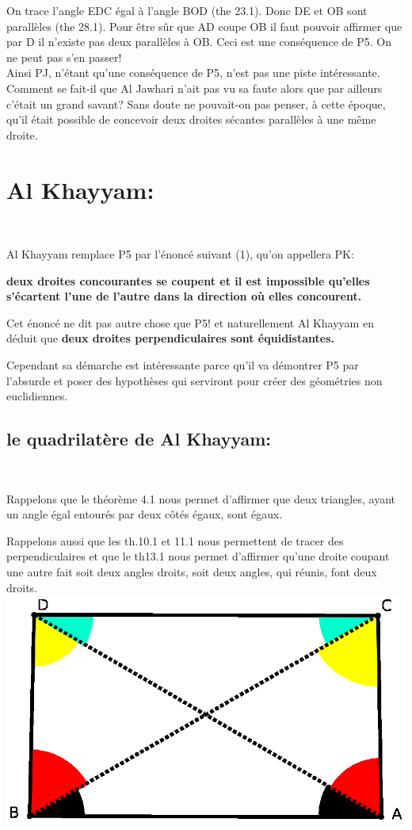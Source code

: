 \documentclass[a4paper, 12pt, twoside]{book}
\begin{document}
    On trace l'angle EDC égal à l'angle BOD (the 23.1). Donc DE et OB sont parallèles (the 28.1). Pour être sûr que AD coupe OB il faut pouvoir affirmer que par D il n'existe pas deux parallèles à OB. Ceci est une conséquence de P5. On ne peut pas s'en passer! \\
    
    Ainsi PJ, n'étant qu'une conséquence de P5, n'est pas une piste intéressante.\\
    
    Comment se fait-il que Al Jawhari n'ait pas vu sa faute alors que par ailleurs c'était un grand savant? Sans doute ne pouvait-on pas penser, à cette époque, qu'il était possible de concevoir deux droites sécantes parallèles à une même droite.  
   

\chapter{Al Khayyam:}\

    
 Al Khayyam remplace P5 par l'énoncé suivant (1), qu'on appellera PK:\
 
 \textbf{deux droites concourantes se coupent et il est impossible qu'elles s'écartent l'une de l'autre dans la direction où elles concourent. }\
 
 Cet énoncé ne dit pas autre  chose que P5! et naturellement Al Khayyam en déduit que \textbf{deux droites perpendiculaires sont équidistantes.} \
 
 Cependant sa démarche est intéressante parce qu'il va démontrer P5 par l'absurde et poser des hypothèses qui serviront pour créer des géométries non euclidiennes.
 
 \section{le quadrilatère de Al Khayyam:}\
 
 
  Rappelons que le théorème 4.1 nous permet d'affirmer que deux triangles, ayant un angle égal entourés par deux côtés égaux, sont égaux.\
  
  Rappelons aussi que les th.10.1 et 11.1 nous permettent de tracer des perpendiculaires et que le th13.1 nous permet d'affirmer qu'une droite coupant une autre fait soit deux angles droits, soit deux angles, qui réunis, font deux droits.\\
  
  
 
 \includegraphics[scale=0.6]{figures/KHAYYAM.eps}\
 
\end{document}
